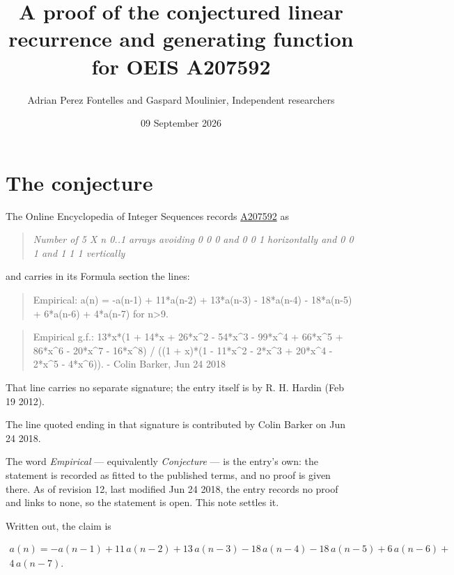 \documentclass[11pt]{article}
\title{A proof of the conjectured linear recurrence and generating function for OEIS A207592}
\author{Adrian Perez Fontelles and Gaspard Moulinier, Independent researchers}
\date{09 September 2026}
\theoremstyle{definition}
\begin{document}
\maketitle
\section{The conjecture}

The Online Encyclopedia of Integer Sequences records \href{https://oeis.org/A207592}{A207592} as

\begin{quote}\itshape Number of 5 X n 0..1 arrays avoiding 0 0 0 and 0 0 1 horizontally and 0 0 1 and 1 1 1 vertically\end{quote}

and carries in its Formula section the lines:

\begin{quote}\ttfamily Empirical: a(n) = -a(n-1) + 11*a(n-2) + 13*a(n-3) - 18*a(n-4) - 18*a(n-5) + 6*a(n-6) + 4*a(n-7) for n>9.\end{quote}

\begin{quote}\ttfamily Empirical g.f.: 13*x*(1 + 14*x + 26*x\textasciicircum{}2 - 54*x\textasciicircum{}3 - 99*x\textasciicircum{}4 + 66*x\textasciicircum{}5 + 86*x\textasciicircum{}6 - 20*x\textasciicircum{}7 - 16*x\textasciicircum{}8) / ((1 + x)*(1 - 11*x\textasciicircum{}2 - 2*x\textasciicircum{}3 + 20*x\textasciicircum{}4 - 2*x\textasciicircum{}5 - 4*x\textasciicircum{}6)). - Colin Barker, Jun 24 2018\end{quote}

That line carries no separate signature; the entry itself is by R. H. Hardin (Feb 19 2012).

The line quoted ending in that signature is contributed by Colin Barker on Jun 24 2018.

The word {\itshape Empirical} --- equivalently {\itshape Conjecture} --- is the entry's own: the statement is recorded as fitted to the published terms, and no proof is given there. As of revision 12, last modified Jun 24 2018, the entry records no proof and links to none, so the statement is open. This note settles it.

Written out, the claim is

\begin{multline*} a(n) = -a(n-1) + 11\,a(n-2) + 13\,a(n-3) - 18\,a(n-4) - 18\,a(n-5) + 6\,a(n-6) + \\ 4\,a(n-7). \end{multline*}
\end{document}
